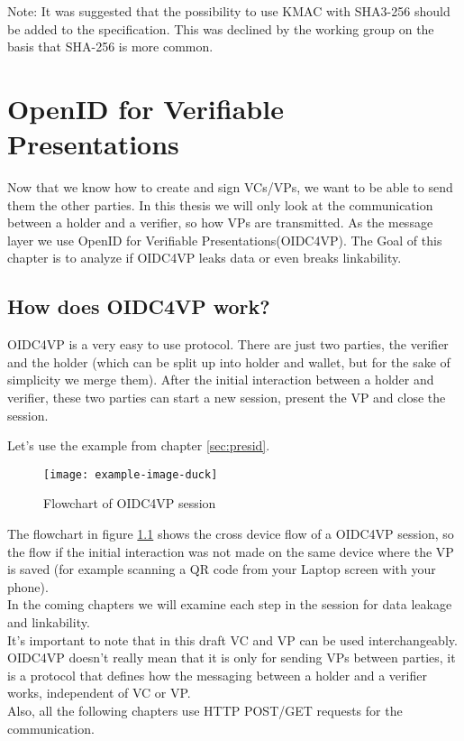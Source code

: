 \documentclass[
	a4paper               %
	,BCOR=0mm            %
	,bibliography=totoc   %
	,listof=totoc         %
	,monolingual
	,twoside=false
]{bfhthesis}              %
\begin{document}
Note: It was suggested that the possibility to use KMAC with SHA3-256 should be added to the specification. This was declined by the working group on the basis that SHA-256 is more common.

\chapter{OpenID for Verifiable Presentations}
Now that we know how to create and sign VCs/VPs, we want to be able to send them the other parties.
In this thesis we will only look at the communication between a holder and a verifier, so how VPs are transmitted.
As the message layer we use OpenID for Verifiable Presentations(OIDC4VP)\cite{oidc4vp}.
The Goal of this chapter is to analyze if OIDC4VP leaks data or even breaks linkability.

\section{How does OIDC4VP work?}
OIDC4VP is a very easy to use protocol.
There are just two parties, the verifier and the holder (which can be split up into holder and wallet, but for the sake of simplicity we merge them).
After the initial interaction between a holder and verifier, these two parties can start a new session, present the VP and close the session.

Let's use the example from chapter \ref{sec:presid}.

\begin{figure}[h]
	\centering
	\texttt{[image: example-image-duck]}
	\label{fig:flowvp}
	\caption{Flowchart of OIDC4VP session}
\end{figure}

The flowchart in figure \ref{fig:flowvp} shows the cross device flow of a OIDC4VP session, so the flow if the initial interaction was not made on the same device where the VP is saved (for example scanning a QR code from your Laptop screen with your phone).\\
In the coming chapters we will examine each step in the session for data leakage and linkability.\\
It's important to note that in this draft VC and VP can be used interchangeably.
OIDC4VP doesn't really mean that it is only for sending VPs between parties, it is a protocol that defines how the messaging between a holder and a verifier works, independent of VC or VP.\\
Also, all the following chapters use HTTP POST/GET requests for the communication.
\end{document}
